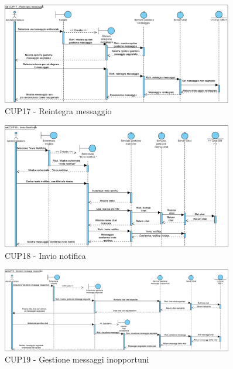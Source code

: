 \begin{figure}
	\centering
	\includegraphics[width=0.9\textwidth]{imgs/gruppo6/sequence/seq_cup17_reintegra_messaggio.pdf}
	\caption{CUP17 - Reintegra messaggio}
	\label{fig:seq-cup17}
\end{figure}

\begin{figure}
	\centering
	\includegraphics[width=0.9\textwidth]{imgs/gruppo6/sequence/CUP18_invio_notifica.pdf}
	\caption{CUP18 - Invio notifica}
	\label{fig:seq-cup18}
\end{figure}


\begin{figure}
	\centering
	\includegraphics[width=0.9\textwidth]{imgs/gruppo6/sequence/CUP19_gestione_messaggi_inopportuni.pdf}
	\caption{CUP19 - Gestione messaggi inopportuni}
	\label{fig:seq-cup19}
\end{figure}

\pagebreak

